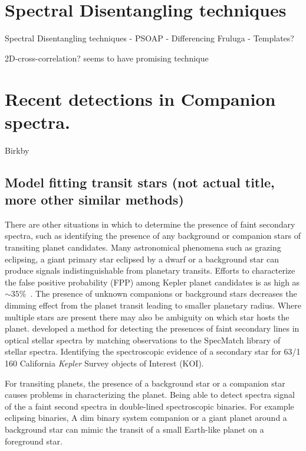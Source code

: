









\section{Spectral Disentangling techniques}

Spectral Disentangling techniques
- PSOAP
- Differencing Fruluga
- Templates?

2D-cross-correlation?   \citet{piskorz_evidence_2016} seems to have promising technique


\section{Recent detections in Companion spectra.}

Birkby


\subsection{Model fitting transit stars (not actual title, more other similar methods)}
There are other situations in which to determine the presence of faint secondary spectra, such as identifying the presence of any background or companion stars of transiting planet candidates.
Many astronomical phenomena such as grazing eclipsing, a giant primary star eclipsed by a dwarf or a background star can produce signals indistinguishable from planetary transits.
Efforts to characterize the false positive probability (FPP) among Kepler planet candidates is as high as $\sim35\%$~\citep{santerne_sophie_2012}.
The presence of unknown companions or background stars decreases the dimming effect from the planet transit leading to smaller planetary radius.
Where multiple stars are present there may also be ambiguity on which star hosts the planet.
\citet{kolbl_detection_2015} developed a method for detecting the presences of faint secondary lines in optical stellar spectra by matching observations to the SpecMatch library of stellar spectra.
Identifying the spectroscopic evidence of a secondary star for 63/1\,160 California \emph{Kepler} Survey objects of Interest (KOI).


For transiting planets, the presence of a background star or a companion star causes problems in characterizing the planet.
Being able to detect spectra signal of the a faint second spectra in double-lined spectroscopic binaries.
For example eclipsing binaries,
A dim binary system companion or a giant planet around a background star can mimic the transit of a small Earth-like planet on a foreground star.







